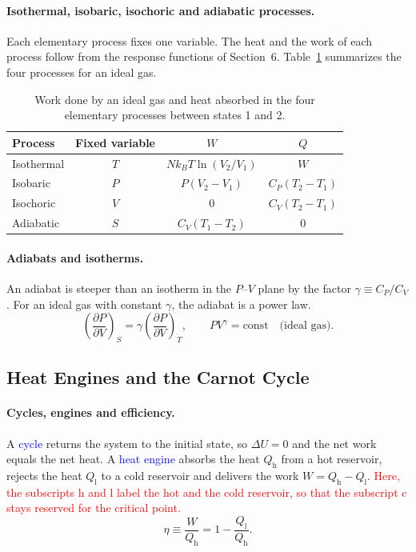 \paragraph{Isothermal, isobaric, isochoric and adiabatic processes.}
Each elementary process fixes one variable. The heat and the work of each
process follow from the response functions of Section~6.
Table~\ref{tab:processes} summarizes the four processes for an ideal gas.
\begin{table}[h]
\centering
\caption{Work done by an ideal gas and heat absorbed in the four elementary
processes between states 1 and 2.}
\label{tab:processes}
\begin{tabular}{lccc}
    Process & Fixed variable & $W$ & $Q$ \\ \hline
    Isothermal & $T$ & $Nk_BT\ln(V_2/V_1)$ & $W$ \\
    Isobaric & $P$ & $P(V_2-V_1)$ & $C_P(T_2-T_1)$ \\
    Isochoric & $V$ & $0$ & $C_V(T_2-T_1)$ \\
    Adiabatic & $S$ & $C_V(T_1-T_2)$ & $0$ \\
\end{tabular}
\end{table}

\paragraph{Adiabats and isotherms.}
An adiabat is steeper than an isotherm in the $P$--$V$ plane by the factor
$\gamma\equiv C_P/C_V$. For an ideal gas with constant $\gamma$, the
adiabat is a power law.
\begin{equation}
    \boxed{\left(\frac{\partial P}{\partial V}\right)_{\!S}
    =\gamma\left(\frac{\partial P}{\partial V}\right)_{\!T},
    \qquad PV^\gamma=\text{const}\quad\text{(ideal gas)}.}
\end{equation}

\subsection{Heat Engines and the Carnot Cycle}

\paragraph{Cycles, engines and efficiency.}
A \textcolor{blue}{cycle} returns the system to the initial state, so
$\Delta U=0$ and the net work equals the net heat. A
\textcolor{blue}{heat engine} absorbs the heat $Q_{\text{h}}$ from a hot
reservoir, rejects the heat $Q_{\text{l}}$ to a cold reservoir and
delivers the work $W=Q_{\text{h}}-Q_{\text{l}}$.
\textcolor{red}{Here, the subscripts h and l label the hot and the cold
reservoir, so that the subscript c stays reserved for the critical point.}
\begin{equation}
    \boxed{\eta\equiv\frac{W}{Q_{\text{h}}}=1-\frac{Q_{\text{l}}}{Q_{\text{h}}}.}
\end{equation}

